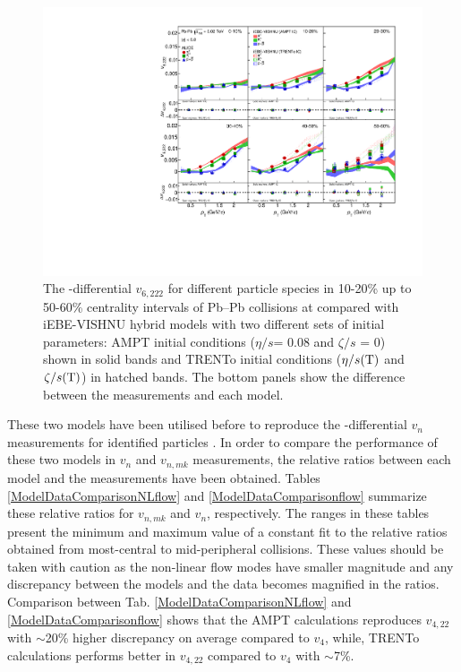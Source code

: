 \begin{figure}[h]
\begin{center}
\includegraphics[scale=0.73]{figures/model/TrentoAndAMPT_v6222_gap00_PID2.pdf}
\end{center}
\caption{The \pT-differential $v_{6,222}$ for different particle species in 10-20\% up to 50-60\% centrality intervals of Pb--Pb collisions at \sNN compared with iEBE-VISHNU hybrid models with two different sets of initial parameters: AMPT initial conditions ($\eta/s$= 0.08 and $\zeta/s$ = 0) shown in solid bands and TRENTo initial conditions ($\eta/s({\rm T})$ and $\zeta/s({\rm T})$) in hatched bands. The bottom panels show the difference between the measurements and each model.}
\label{v6222_model}
\end{figure}


These two models have been utilised before to reproduce the \pT-differential $v_n$ measurements for identified particles \cite{Acharya:2018zuq}. In order to compare the performance of these two models in $v_n$ and $v_{n,mk}$ measurements, the relative ratios between each model and the measurements have been obtained. Tables \ref{ModelDataComparisonNLflow} and \ref{ModelDataComparisonflow} summarize these relative ratios for $v_{n,mk}$ and $v_{n}$, respectively. The ranges in these tables present the minimum and maximum value of a constant fit to the relative ratios obtained from most-central to mid-peripheral collisions. These values should be taken with caution as the non-linear flow modes have smaller magnitude and any discrepancy between the models and the data becomes magnified in the ratios. Comparison between Tab. \ref{ModelDataComparisonNLflow} and \ref{ModelDataComparisonflow} shows that the AMPT calculations reproduces $v_{4,22}$ with $\sim$20\% higher discrepancy on average compared to $v_{4}$, while, TRENTo calculations performs better in $v_{4,22}$ compared to $v_{4}$ with $\sim$7\%.  

